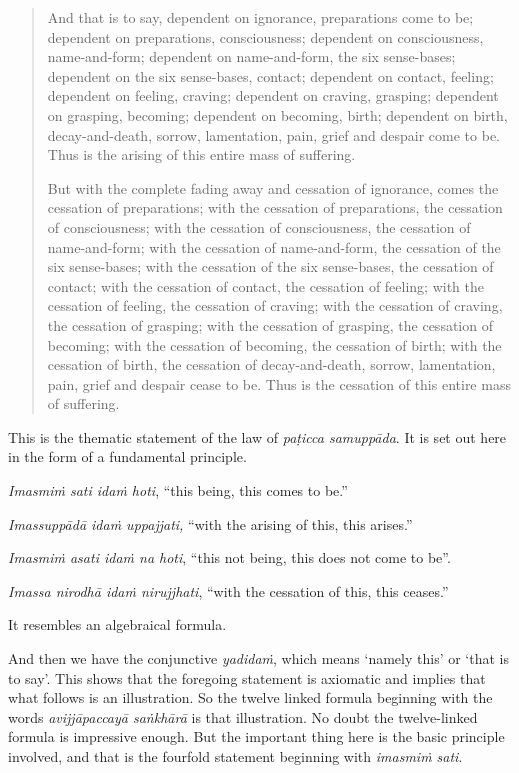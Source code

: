 \begin{quote}
And that is to say, dependent on ignorance, preparations come to be; dependent on preparations, consciousness; dependent on consciousness, name-and-form; dependent on name-and-form, the six sense-bases; dependent on the six sense-bases, contact; dependent on contact, feeling; dependent on feeling, craving; dependent on craving, grasping; dependent on grasping, becoming; dependent on becoming, birth; dependent on birth, decay-and-death, sorrow, lamentation, pain, grief and despair come to be. Thus is the arising of this entire mass of suffering.

But with the complete fading away and cessation of ignorance, comes the cessation of preparations; with the cessation of preparations, the cessation of consciousness; with the cessation of consciousness, the cessation of name-and-form; with the cessation of name-and-form, the cessation of the six sense-bases; with the cessation of the six sense-bases, the cessation of contact; with the cessation of contact, the cessation of feeling; with the cessation of feeling, the cessation of craving; with the cessation of craving, the cessation of grasping; with the cessation of grasping, the cessation of becoming; with the cessation of becoming, the cessation of birth; with the cessation of birth, the cessation of decay-and-death, sorrow, lamentation, pain, grief and despair cease to be. Thus is the cessation of this entire mass of suffering.
\end{quote}

This is the thematic statement of the law of \emph{paṭicca samuppāda}. It is set out here in the form of a fundamental principle.

\emph{Imasmiṁ sati idaṁ hoti}, ``this being, this comes to be.''

\emph{Imassuppādā idaṁ uppajjati,} ``with the arising of this, this arises.''

\emph{Imasmiṁ asati idaṁ na hoti}, ``this not being, this does not come to be''.

\emph{Imassa nirodhā idaṁ nirujjhati}, ``with the cessation of this, this ceases.''

It resembles an algebraical formula.

And then we have the conjunctive \emph{yadidaṁ}, which means `namely this' or `that is to say'. This shows that the foregoing statement is axiomatic and implies that what follows is an illustration. So the twelve linked formula beginning with the words \emph{avijjāpaccayā saṅkhārā} is that illustration. No doubt the twelve-linked formula is impressive enough. But the important thing here is the basic principle involved, and that is the fourfold statement beginning with \emph{imasmiṁ sati}.

